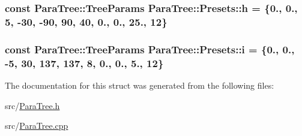 \subsubsection[{\texorpdfstring{h}{h}}]{\setlength{\rightskip}{0pt plus 5cm}const {\bf Para\+Tree\+::\+Tree\+Params} Para\+Tree\+::\+Presets\+::h = \{0., 0., 5, -\/30, -\/90, 90, 40, 0., 0., 25., 12\}\hspace{0.3cm}{\ttfamily [static]}}\hypertarget{struct_para_tree_1_1_presets_a140de0ee6d4a2eca71f2757e410e1aa0}{}\label{struct_para_tree_1_1_presets_a140de0ee6d4a2eca71f2757e410e1aa0}
\subsubsection[{\texorpdfstring{i}{i}}]{\setlength{\rightskip}{0pt plus 5cm}const {\bf Para\+Tree\+::\+Tree\+Params} Para\+Tree\+::\+Presets\+::i = \{0., 0., -\/5, 30, 137, 137, 8, 0., 0., 5., 12\}\hspace{0.3cm}{\ttfamily [static]}}\hypertarget{struct_para_tree_1_1_presets_ab93eec0b9e208968f9302197f1bbeb07}{}\label{struct_para_tree_1_1_presets_ab93eec0b9e208968f9302197f1bbeb07}


The documentation for this struct was generated from the following files\+:\begin{DoxyCompactItemize}
\item 
src/\hyperlink{_para_tree_8h}{Para\+Tree.\+h}\item 
src/\hyperlink{_para_tree_8cpp}{Para\+Tree.\+cpp}\end{DoxyCompactItemize}
